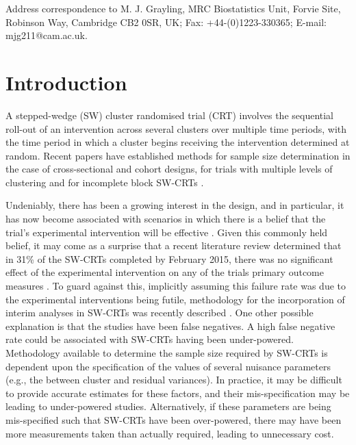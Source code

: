 \documentclass{article}
\newenvironment{bottompar}{\par\vspace*{\fill}}{\clearpage}
\begin{document}
\begin{bottompar}
	\noindent Address correspondence to M. J. Grayling, MRC Biostatistics Unit, Forvie Site, Robinson Way, Cambridge CB2 0SR, UK; Fax: +44-(0)1223-330365; E-mail: mjg211@cam.ac.uk. 
\end{bottompar}

\section{Introduction}

A stepped-wedge (SW) cluster randomised trial (CRT) involves the sequential roll-out of an intervention across several clusters over multiple time periods, with the time period in which a cluster begins receiving the intervention determined at random. Recent papers have established methods for sample size determination in the case of cross-sectional \citep{hussey2007} and cohort \citep{hooper2016} designs, for trials with multiple levels of clustering and for incomplete block SW-CRTs \citep{hemming2015}.

Undeniably, there has been a growing interest in the design, and in particular, it has now become associated with scenarios in which there is a belief that the trial's experimental intervention will be effective \citep{brown2006,mdege2011}. Given this commonly held belief, it may come as a surprise that a recent literature review determined that in 31\% of the SW-CRTs completed by February 2015, there was no significant effect of the experimental intervention on any of the trials primary outcome measures \citep{grayling2017}. To guard against this, implicitly assuming this failure rate was due to the experimental interventions being futile, methodology for the incorporation of interim analyses in SW-CRTs was recently described \citep{grayling2017b}. One other possible explanation is that the studies have been false negatives. A high false negative rate could be associated with SW-CRTs having been under-powered. Methodology available to determine the sample size required by SW-CRTs is dependent upon the specification of the values of several nuisance parameters (e.g., the between cluster and residual variances). In practice, it may be difficult to provide accurate estimates for these factors, and their mis-specification may be leading to under-powered studies. Alternatively, if these parameters are being mis-specified such that SW-CRTs have been over-powered, there may have been more measurements taken than actually required, leading to unnecessary cost.
\end{document}
